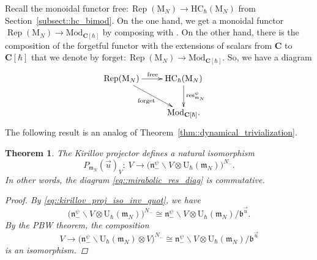 \documentclass[10pt,a4paper]{article}
\numberwithin{equation}{section}
\newtheorem{Theorem}{Theorem}[section]
\newcommand{\C}{\mathbf{C}}
\newcommand{\U}{\mathrm{U}_{\hbar}}
\newcommand{\rM}{\mathrm{M}}
\renewcommand{\b}{\mathfrak{b}}
\newcommand{\n}{\mathfrak{n}}
\newcommand{\m}{\mathfrak{m}}
\newcommand{\Mod}[1]{{\mathrm{Mod}}_{#1}}
\newcommand{\forget}{\mathrm{forget}}
\newcommand{\free}{\mathrm{free}}
\newcommand{\HC}{\mathrm{HC}_{\hbar}}
\DeclareMathOperator{\Rep}{Rep}
\newcommand{\res}{\mathrm{res}}
\begin{document}
	Recall the monoidal functor $\free \colon \Rep(\rM_N) \rightarrow \HC(\rM_N)$ from Section~\ref{subsect::hc_bimod}. On the one hand, we get a monoidal functor $\Rep(\rM_N) \rightarrow \Mod{\C[\hbar]}$ by composing with \smash{$\res_{\m_N}^{\psi}$}. On the other hand, there is the composition of the forgetful functor with the extensions of scalars from $\C$ to $\C[\hbar]$ that we denote by $\forget\colon \Rep(\rM_N) \rightarrow \Mod{\C[\hbar]}$. So, we have a diagram
	\begin{equation}
		\label{eq::mirabolic_res_diag}
\begin{split}
& \xymatrix{
			\Rep(\rM_N) \ar[r]^{\free} \ar[dr]_{\forget} & \HC(\rM_N) \ar[d]^{\res_{\m_N}^{\psi}} \\
			& \Mod{\C[\hbar]}.
		}
\end{split}
	\end{equation}
	The following result is an analog of Theorem~\ref{thm::dynamical_trivialization}.
	\begin{Theorem}
		\label{thm::mirabolic_kw_trivialization}
		The Kirillov projector defines a natural isomorphism
		\[
		P_{\m_N}(\vec{u})_V \colon\ V \rightarrow \bigl(\n_-^{\psi} \backslash V \otimes \U(\m_N)\bigr)^{N_-}.
		\]
		In other words, the diagram \eqref{eq::mirabolic_res_diag} is commutative.
		\begin{proof}
			By \eqref{eq::kirillov_proj_iso_inv_quot}, we have
			\[
			\bigl(\n_-^{\psi} \backslash V \otimes \U(\m_N)\bigr)^{N_-} \cong \n_-^{\psi} \backslash V \otimes \U(\m_N) / \b^{\vec{u}}.
			\]
			By the PBW theorem, the composition
			\[
			V \rightarrow \bigl(\n_-^{\psi} \backslash \U(\m_N) \otimes V\bigr)^{N_-} \cong \n_-^{\psi} \backslash V \otimes \U(\m_N) / \b^{\vec{u}}
			\]
			is an isomorphism.
		\end{proof}
	\end{Theorem}
	
\end{document}
